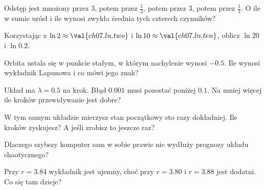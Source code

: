 \canyou

\begin{checkpoint}
\item Odstęp jest mnożony przez $3$, potem przez $\tfrac13$, potem przez $3$,
  potem przez $\tfrac13$. O ile w sumie urósł i ile wynosi zwykła średnia tych
  czterech czynników?
\item Korzystając z $\ln 2 \approx \val{ch07.ln.two}$ i
  $\ln 10 \approx \val{ch07.ln.ten}$, oblicz $\ln 20$ i $\ln\num{0.2}$.
\item Orbita ustala się w punkcie stałym, w którym nachylenie wynosi
  $-\num{0.5}$. Ile wynosi wykładnik Lapunowa i co mówi jego znak?
\item Układ ma $\lambda = \num{0.5}$ na krok. Błąd $\num{0.001}$ musi pozostać
  poniżej $\num{0.1}$. Na mniej więcej ile kroków przewidywanie jest dobre?
\item W tym samym układzie mierzysz stan początkowy sto razy dokładniej. Ile
  kroków zyskujesz? A jeśli zrobisz to jeszcze raz?
\item Dlaczego szybszy komputer sam w sobie prawie nie wydłuży prognozy
  układu chaotycznego?
\item Przy $r = \num{3.84}$ wykładnik jest ujemny, choć przy $r = \num{3.80}$
  i $r = \num{3.88}$ jest dodatni. Co się tam dzieje?
\end{checkpoint}
